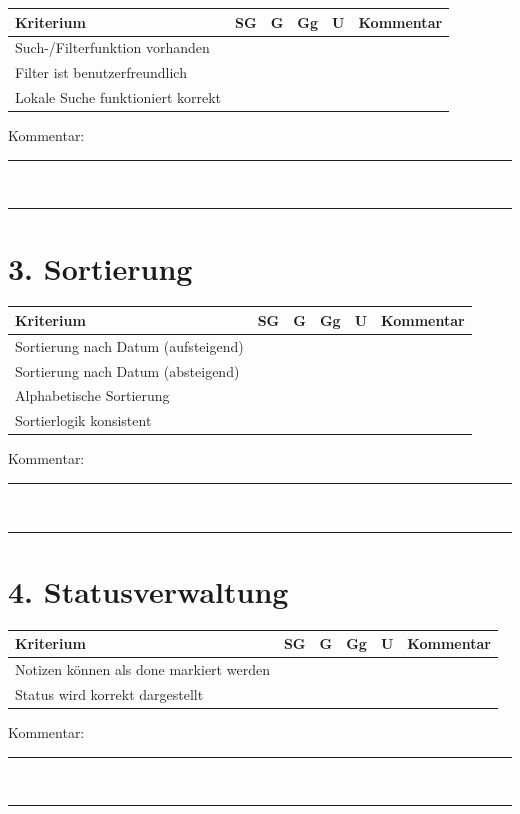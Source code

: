 \documentclass[a4paper,12pt]{article}
\begin{document}
\begin{longtable}{|p{6cm}|c|c|c|c|p{4cm}|}
\hline
Kriterium & SG & G & Gg & U & Kommentar \\
\hline
Such-/Filterfunktion vorhanden & & & & & \\
\hline
Filter ist benutzerfreundlich & & & & & \\
\hline
Lokale Suche funktioniert korrekt & & & & & \\
\hline
\end{longtable}

Kommentar:\\
\rule{\textwidth}{0.4pt}\\
\rule{\textwidth}{0.4pt}

\section*{3. Sortierung}

\begin{longtable}{|p{6cm}|c|c|c|c|p{4cm}|}
\hline
Kriterium & SG & G & Gg & U & Kommentar \\
\hline
Sortierung nach Datum (aufsteigend) & & & & & \\
\hline
Sortierung nach Datum (absteigend) & & & & & \\
\hline
Alphabetische Sortierung & & & & & \\
\hline
Sortierlogik konsistent & & & & & \\
\hline
\end{longtable}

Kommentar:\\
\rule{\textwidth}{0.4pt}\\
\rule{\textwidth}{0.4pt}

\section*{4. Statusverwaltung}

\begin{longtable}{|p{6cm}|c|c|c|c|p{4cm}|}
\hline
Kriterium & SG & G & Gg & U & Kommentar \\
\hline
Notizen können als done markiert werden & & & & & \\
\hline
Status wird korrekt dargestellt & & & & & \\
\hline
\end{longtable}

Kommentar:\\
\rule{\textwidth}{0.4pt}\\
\rule{\textwidth}{0.4pt}
\end{document}
